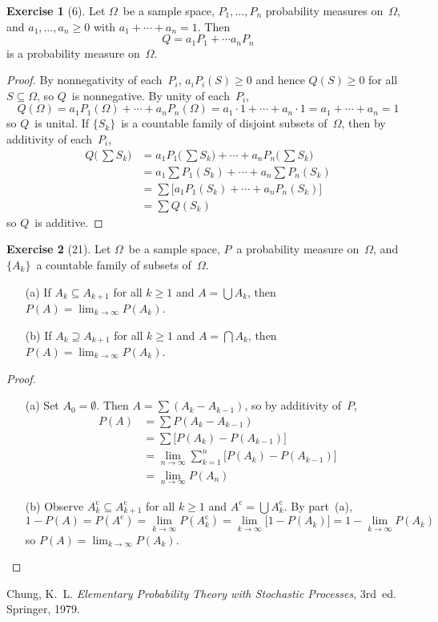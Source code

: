 \documentclass[letterpaper,12pt]{article}
\newcommand{\bigunion}{\bigcup}
\newcommand{\bigsect}{\bigcap}
\newcommand{\comp}[1]{#1^{\text{c}}}
\theoremstyle{definition}
\newtheorem*{exer}{Exercise}
\theoremstyle{remark}
\begin{document}
\begin{exer}[6]
Let \(\Omega\)~be a sample space, \(P_1,\ldots,P_n\) probability measures on~\(\Omega\), and \(a_1,\ldots,a_n\ge0\) with \(a_1+\cdots+a_n=1\). Then
\[Q=a_1P_1+\cdots a_nP_n\]
is a probability measure on~\(\Omega\).
\end{exer}
\begin{proof}
By nonnegativity of each~\(P_i\), \(a_iP_i(S)\ge0\) and hence \(Q(S)\ge0\) for all \(S\subseteq\Omega\), so \(Q\)~is nonnegative. By unity of each~\(P_i\),
\[Q(\Omega)=a_1P_1(\Omega)+\cdots+a_nP_n(\Omega)=a_1\cdot1+\cdots+a_n\cdot1=a_1+\cdots+a_n=1\]
so \(Q\)~is unital. If \(\{S_k\}\)~is a countable family of disjoint subsets of~\(\Omega\), then by additivity of each~\(P_i\),
\begin{align*}
Q\bigl(\,\sum S_k\bigr)&=a_1P_1\bigl(\,\sum S_k\bigl)+\cdots+a_nP_n\bigl(\,\sum S_k\bigr)\\
	&=a_1\sum P_1(S_k)+\cdots+a_n\sum P_n(S_k)\\
	&=\sum\bigl[a_1P_1(S_k)+\cdots+a_nP_n(S_k)\bigr]\\
	&=\sum Q(S_k)
\end{align*}
so \(Q\)~is additive.
\end{proof}

\begin{exer}[21]
Let \(\Omega\)~be a sample space, \(P\)~a probability measure on~\(\Omega\), and \(\{A_k\}\)~a countable family of subsets of~\(\Omega\).
\begin{enumerate}[itemsep=0pt]
\item[(a)] If \(A_k\subseteq A_{k+1}\) for all \(k\ge1\) and \(A=\bigunion A_k\), then \(P(A)=\lim_{k\to\infty}P(A_k)\).
\item[(b)] If \(A_k\supseteq A_{k+1}\) for all \(k\ge1\) and \(A=\bigsect A_k\), then \(P(A)=\lim_{k\to\infty}P(A_k)\).
\end{enumerate}
\end{exer}
\begin{proof}
\begin{enumerate}[itemsep=0pt]
\item[(a)] Set \(A_0=\emptyset\). Then \(A=\sum(A_k-A_{k-1})\), so by additivity of~\(P\),
\begin{align*}
P(A)&=\sum P(A_k-A_{k-1})\\
	&=\sum\bigl[P(A_k)-P(A_{k-1})\bigr]\\
	&=\lim_{n\to\infty}\sum_{k=1}^n\bigl[P(A_k)-P(A_{k-1})\bigr]\\
	&=\lim_{n\to\infty}P(A_n)
\end{align*}
\item[(b)] Observe \(\comp{A_k}\subseteq\comp{A_{k+1}}\) for all \(k\ge1\) and \(\comp{A}=\bigunion\comp{A_k}\). By part~(a),
\[1-P(A)=P(\comp{A})=\lim_{k\to\infty}P(\comp{A_k})=\lim_{k\to\infty}\bigl[1-P(A_k)\bigr]=1-\lim_{k\to\infty}P(A_k)\]
so \(P(A)=\lim_{k\to\infty}P(A_k)\).\qedhere
\end{enumerate}
\end{proof}

\begin{thebibliography}{0}
 Chung, K.~L. \textit{Elementary Probability Theory with Stochastic Processes}, 3rd~ed. Springer, 1979.
\end{thebibliography}
\end{document}
